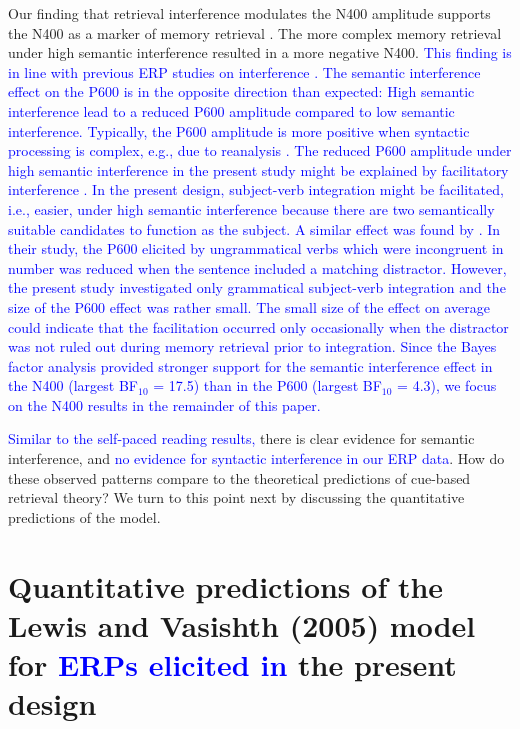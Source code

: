 \documentclass[a4paper, man, floatsintext]{apa7}
\begin{document}
Our finding that retrieval interference modulates the N400 amplitude supports the N400 as a marker of memory retrieval \citep{kutas&federmeier_2000, kutas_federmeier2011, brouwer2017_n4_p6, lau2008_n400}. The more complex memory retrieval under high semantic interference resulted in a more negative N400. \textcolor{blue}{This finding is in line with previous ERP studies on interference \citep{lee_garnsey, vasishth_drenhaus_2011, martinetal2014, schoknecht2022}. The semantic interference effect on the P600 is in the opposite direction than expected: High semantic interference lead to a reduced P600 amplitude compared to low semantic interference. Typically, the P600 amplitude is more positive when syntactic processing is complex, e.g., due to reanalysis \citep{osterhout&holcomb_1992}. The reduced P600 amplitude under high semantic interference in the present study might be explained by facilitatory interference \citep[see e.g.,][]{jaeger_etal_2017}. In the present design, subject-verb integration might be facilitated, i.e., easier, under high semantic interference because there are two semantically suitable candidates to function as the subject. A similar effect was found by \textcite{Tanner_etal_2017}. In their study, the P600 elicited by ungrammatical verbs which were incongruent in number was reduced when the sentence included a matching distractor. However, the present study investigated only grammatical subject-verb integration and the size of the P600 effect was rather small. The small size of the effect on average could indicate that the facilitation occurred only occasionally when the distractor was not ruled out during memory retrieval prior to integration. Since the Bayes factor analysis provided stronger support for the semantic interference effect in the N400 (largest BF$_{10}$ = 17.5) than in the P600 (largest BF$_{10}$ = 4.3), we focus on the N400 results in the remainder of this paper.}

\textcolor{blue}{Similar to the self-paced reading results,} there is clear evidence for semantic interference, and \textcolor{blue}{no evidence for syntactic interference in our ERP data}. How do these observed patterns compare to the theoretical predictions of cue-based retrieval theory? We turn to this point next by discussing the quantitative predictions of the \textcite{Lewis2005} model.

\section{Quantitative predictions of the Lewis and Vasishth (2005) model for \textcolor{blue}{ERPs elicited in} the present design}
\end{document}
